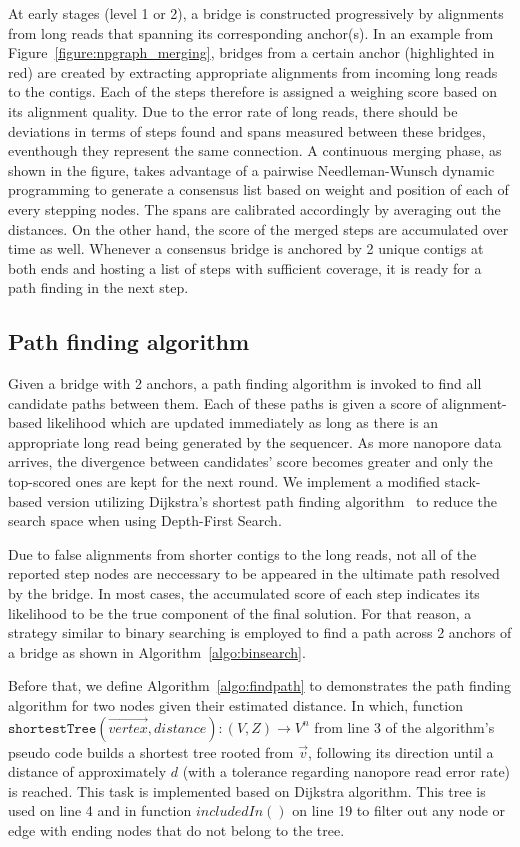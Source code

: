 \documentclass[10pt,twocolumn,twoside]{genpaper}
\begin{document}
At early stages (level 1 or 2), a bridge is constructed progressively by alignments from long reads that spanning its corresponding anchor(s).
In an example from Figure~\ref{figure:npgraph_merging}, bridges from a certain anchor (highlighted in red) are created by extracting appropriate alignments from incoming long reads to the contigs. Each of the steps therefore is assigned a weighing score based on its alignment quality.
Due to the error rate of long reads, there should be deviations in terms of steps found and spans measured between these bridges, eventhough they represent the same connection.
A continuous merging phase, as shown in the figure, takes advantage of a pairwise Needleman-Wunsch dynamic programming to generate a consensus list based on weight and position of each of every stepping nodes. The spans are calibrated accordingly by averaging out the distances. On the other hand, the score of the merged steps are accumulated over time as well.
Whenever a consensus bridge is anchored by 2 unique contigs at both ends and hosting a list of steps with sufficient coverage, it is ready for a path finding in the next step.


\subsection*{Path finding algorithm}
Given a bridge with 2 anchors, a path finding algorithm is invoked to find all candidate paths between them. Each of these paths is given a score of alignment-based likelihood which are updated immediately as long as there is an appropriate long read being generated by the sequencer. As more nanopore data arrives, the divergence between candidates' score becomes greater and only the top-scored ones are kept for the next round.
We implement a modified stack-based version utilizing Dijkstra's shortest path finding algorithm~\cite{Dijkstra1959} to reduce the search space when using Depth-First Search.

Due to false alignments from shorter contigs to the long reads, not all of the reported step nodes are neccessary to be appeared in the ultimate path resolved by the bridge. 
In most cases, the accumulated score of each step indicates its likelihood to be the true component of the final solution.
For that reason, a strategy similar to binary searching is employed to find a path across 2 anchors of a bridge as shown in Algorithm~\ref{algo:binsearch}.


Before that, we define Algorithm~\ref{algo:findpath} to demonstrates the path finding algorithm for two nodes given their estimated distance. In which, function 
$\mathtt{shortestTree}(\overrightarrow{vertex},distance) : (V,Z) \rightarrow V^n$ 
from line 3 of the algorithm's pseudo code builds a shortest tree rooted from $\overrightarrow{v}$, following its direction until a distance of approximately $d$ (with a tolerance regarding nanopore read error rate) is reached. This task is implemented based on Dijkstra algorithm.
This tree is used on line 4 and in function $includedIn()$ on line 19 to filter out any node or edge with ending nodes that do not belong to the tree.
\end{document}
